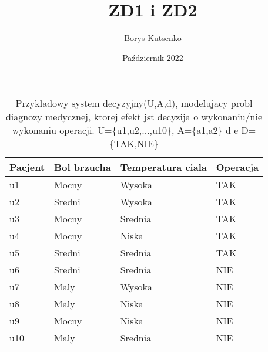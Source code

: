 \documentclass[12pt, letterpaper, titlepage]{article}
\title{ZD1 i ZD2}
\author{Borys Kutsenko}
\date{Październik 2022}
\begin{document}
\maketitle
\begin{table}[h]
\centering\caption{Przykladowy system decyzyjny(U,A,d), modelujacy probl diagnozy medycznej, ktorej efekt jst decyzija o wykonaniu/nie wykonaniu operacji. U=\{u1,u2,...,u10\}, A=\{a1,a2\} d e D=\{TAK,NIE\}}
\begin{tabular}{l|l l l}
\hline
Pacjent & Bol brzucha & Temperatura ciala & Operacja\\
\hline
u1 & Mocny & Wysoka & TAK\\
u2 & Sredni & Wysoka & TAK\\
u3 & Mocny & Srednia & TAK\\
u4 & Mocny & Niska & TAK\\
u5 & Sredni & Srednia & TAK\\
u6 & Sredni & Srednia & NIE\\
u7 & Maly & Wysoka & NIE\\
u8 & Maly & Niska & NIE\\
u9 & Mocny & Niska & NIE\\
u10 & Maly & Srednia & NIE\\
\hline
\end{tabular}
\end{table}
\end{document}
